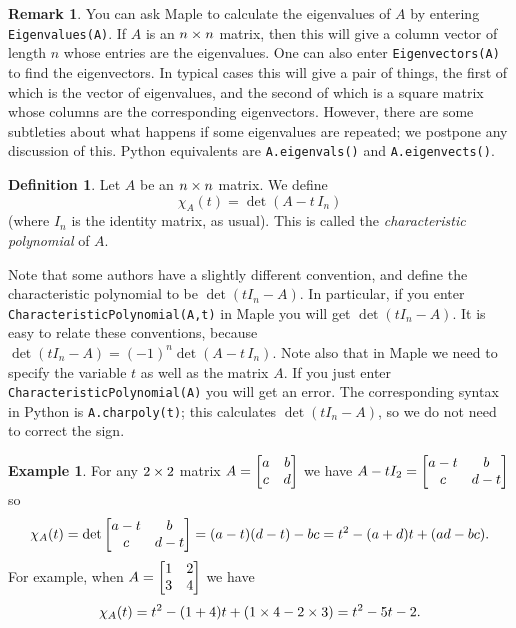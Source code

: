 \documentclass[reqno]{amsart}
\theoremstyle{definition}
\newtheorem{remark}[theorem]{Remark}
\newtheorem{definition}[theorem]{Definition}
\newtheorem{example}[theorem]{Example}
\newcommand{\dfn}[1]{\emph{{#1}}\index{#1}}
\begin{document}
\begin{remark}
 You can ask Maple to calculate the eigenvalues of $A$ by entering
 \verb+Eigenvalues(A)+.  If $A$ is an $n\times n$ matrix, then this will
 give a column vector of length $n$ whose entries are the
 eigenvalues.  One can also enter \verb+Eigenvectors(A)+ to find the
 eigenvectors.  In typical cases this will give a pair of things, the
 first of which is the vector of eigenvalues, and the second of which
 is a square matrix whose columns are the corresponding eigenvectors.
 However, there are some subtleties about what happens if some
 eigenvalues are repeated; we postpone any discussion of this.  Python
 equivalents are \verb|A.eigenvals()| and \verb|A.eigenvects()|.
\end{remark}

\begin{definition}\label{defn-chi}
 Let $A$ be an $n\times n$ matrix.  We define
 \[ \chi_A(t) = \det(A-t\,I_n) \]
 (where $I_n$ is the identity matrix, as usual).  This is called the
 \dfn{characteristic polynomial} of $A$.
\end{definition}

Note that some authors have a slightly different convention, and
define the characteristic polynomial to be $\det(t I_n-A)$.  In
particular, if you enter \verb+CharacteristicPolynomial(A,t)+ in Maple
you will get $\det(t I_n-A)$.  It is easy to relate these conventions,
because $\det(t I_n-A)=(-1)^n\det(A-t\,I_n)$.  Note also that in Maple
we need to specify the variable $t$ as well as the matrix $A$.  If you
just enter \verb+CharacteristicPolynomial(A)+ you will get an error.
The corresponding syntax in Python is \verb|A.charpoly(t)|; this
calculates $\det(tI_n-A)$, so we do not need to correct the sign.

\begin{example}\label{eg-chi-two}
 For any $2\times 2$ matrix $A=\left[\begin{matrix} a&b \\ c&d\end{matrix}\right]$ we have
 $A-tI_2=\left[\begin{matrix} a-t & b \\ c & d-t\end{matrix}\right]$ so
 \[ \chi_A(t) = \det\left[\begin{matrix} a-t & b \\ c & d-t\end{matrix}\right] =
     (a-t)(d-t) - bc = t^2 - (a+d)t + (ad-bc).
 \]
 For example, when $A=\left[\begin{matrix} 1 & 2 \\ 3 & 4 \end{matrix}\right]$ we have
 \[ \chi_A(t) = t^2 - (1+4) t + (1\times 4-2\times 3)
     = t^2 - 5t - 2.
 \]
\end{example}
\end{document}
